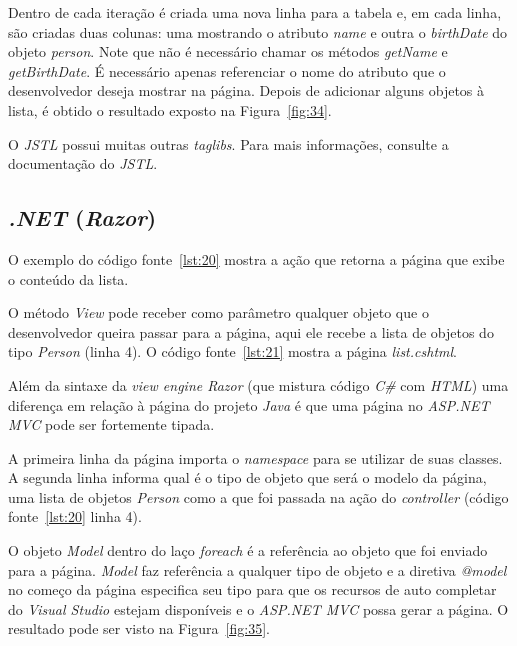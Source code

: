 Dentro de cada iteração é criada uma nova linha para a tabela e, em cada linha, são criadas duas colunas: uma mostrando o atributo \textit{name} e outra o \textit{birthDate} do objeto \textit{person}. Note que não é necessário chamar os métodos \textit{getName} e \textit{getBirthDate}. É necessário apenas referenciar o nome do atributo que o desenvolvedor deseja mostrar na página. Depois de adicionar alguns objetos à lista, é obtido o resultado exposto na Figura~\ref{fig:34}.


O \textit{JSTL} possui muitas outras \textit{taglibs}. Para mais informações, consulte a documentação do \textit{JSTL}.

\subsection{\textit{.NET} (\textit{Razor})}

O exemplo do código fonte~\ref{lst:20} mostra a ação que retorna a página que exibe o conteúdo da lista.

\newpage


O método \textit{View} pode receber como parâmetro qualquer objeto que o desenvolvedor queira passar para a página, aqui ele recebe a lista de objetos do tipo \textit{Person} (linha 4). O código fonte~\ref{lst:21} mostra a página \textit{list.cshtml}.


Além da sintaxe da \textit{view engine Razor} (que mistura código \textit{C\#} com \textit{HTML}) uma diferença em relação à página do projeto \textit{Java} é que uma página no \textit{ASP.NET MVC} pode ser fortemente tipada.

A primeira linha da página importa o \textit{namespace}  para se utilizar de suas classes. A segunda linha informa qual é o tipo de objeto que será o modelo da página, uma lista de objetos \textit{Person} como a que foi passada na ação do \textit{controller} (código fonte~\ref{lst:20} linha 4).

O objeto \textit{Model} dentro do laço \textit{foreach} é a referência ao objeto que foi enviado para a página. \textit{Model} faz referência a qualquer tipo de objeto e a diretiva \textit{@model} no começo da página especifica seu tipo para que os recursos de auto completar do \textit{Visual Studio} estejam disponíveis e o \textit{ASP.NET MVC} possa gerar a página. O resultado pode ser visto na Figura~\ref{fig:35}.

